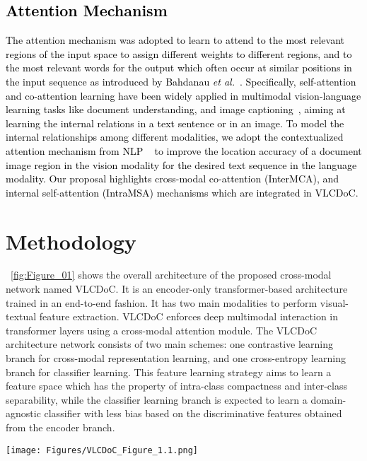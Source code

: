 \documentclass[preprint,review,12pt]{elsarticle}
\newcommand{\etal}{\textit{et al.}}
\begin{document}
\subsection{\textcolor{black}{Attention Mechanism}}
\textcolor{black}{The attention mechanism was adopted to learn to attend to the most relevant regions of the input space to assign different weights to different regions, and to the most relevant words for the output which often occur at similar positions in the input sequence as introduced by Bahdanau \etal~\cite{Bahdanau2015NeuralMT}. Specifically, self-attention and co-attention learning have been widely applied in multimodal vision-language learning tasks like document understanding, and image captioning~\cite{li2021selfdoc, appalaraju2021docformer, Nam_2017_CVPR}, aiming at learning the internal relations in a text sentence or in an image. To model the internal relationships among different modalities, we adopt the contextualized attention mechanism from NLP ~\cite{vaswani2017attention}
to improve the location accuracy of a document image region in the vision modality for the desired text sequence in the language modality. 
Our proposal highlights cross-modal co-attention (InterMCA), and internal self-attention (IntraMSA) mechanisms which are integrated in VLCDoC.}

\section{Methodology}
\figurename~\ref{fig:Figure_01} shows the overall architecture of the proposed cross-modal network named VLCDoC. It is an encoder-only transformer-based architecture trained in an end-to-end fashion. It has two main modalities to perform visual-textual feature extraction. VLCDoC enforces deep multimodal interaction in transformer layers using a cross-modal attention module. The VLCDoC architecture network consists of two main schemes: one contrastive learning branch for cross-modal representation learning, and one cross-entropy learning branch for classifier learning. This feature learning strategy aims to learn a feature space which has the property of intra-class compactness and inter-class separability, while the classifier learning branch is expected to learn a domain-agnostic classifier with less bias based on the discriminative features obtained from the encoder branch.
\begin{figure*}[t]
\centering
  \centerline{\texttt{[image: Figures/VLCDoC\_Figure\_1.1.png]}}
    \caption{\textcolor{black}{Overview of the proposed cross-modal contrastive learning method. The network is composed of InterMCA and IntraMSA modules with flexible attention mechanisms to learn cross-modal representations in a cross-modal contrastive learning fashion.}}
    \label{fig:Figure_01}
\end{figure*}
\end{document}
